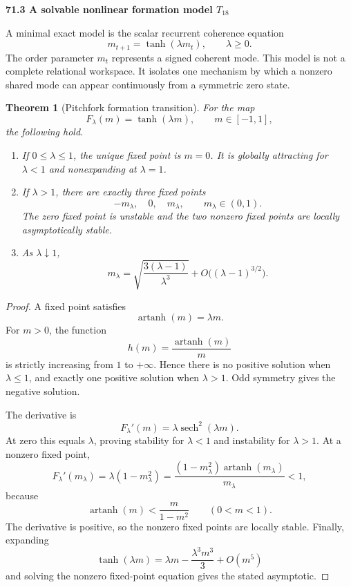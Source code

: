 \documentclass[11pt,letterpaper]{article}
\newcommand{\subtopic}[1]{%
 \vspace{0.45em}
 {\bfseries\color{AccentColor} #1\par}
}
\theoremstyle{plain}
\newtheorem{theorem}{Theorem}
\theoremstyle{definition}
\begin{document}
\subtopic{71.3 A solvable nonlinear formation model \(T_{18}\) }

A minimal exact model is the scalar recurrent coherence equation
\[
\boxed{
m_{t+1}=\tanh(\lambda m_t),
\qquad
\lambda\geq0.
}
\]
The order parameter \(m_t\) represents a signed coherent mode. This model is
not a complete relational workspace. It isolates one mechanism by which a
nonzero shared mode can appear continuously from a symmetric zero state.

\begin{theorem}[Pitchfork formation transition]\label{thm:pitchfork-formation}
For the map
\[
F_\lambda(m)=\tanh(\lambda m),
\qquad
m\in[-1,1],
\]
the following hold.
\begin{enumerate}
\item If \(0\leq\lambda\leq1\), the unique fixed point is \(m=0\).
 It is globally attracting for \(\lambda<1\) and nonexpanding at
 \(\lambda=1\).
\item If \(\lambda>1\), there are exactly three fixed points
 \[
 -m_\lambda,
 \quad0,
 \quad m_\lambda,
 \qquad
 m_\lambda\in(0,1).
 \]
 The zero fixed point is unstable and the two nonzero fixed points are
 locally asymptotically stable.
\item As \(\lambda\downarrow1\),
 \[
 \boxed{
 m_\lambda
 =
 \sqrt{\frac{3(\lambda-1)}{\lambda^3}}
 +
 O\bigl((\lambda-1)^{3/2}\bigr).
 }
 \]
\end{enumerate}
\end{theorem}

\begin{proof}
A fixed point satisfies
\[
\operatorname{artanh}(m)=\lambda m.
\]
For \(m>0\), the function
\[
h(m)=\frac{\operatorname{artanh}(m)}{m}
\]
is strictly increasing from \(1\) to \(+\infty\). Hence there is no positive
solution when \(\lambda\leq1\), and exactly one positive solution when
\(\lambda>1\). Odd symmetry gives the negative solution.

The derivative is
\[
F_\lambda'(m)
=
\lambda\operatorname{sech}^2(\lambda m).
\]
At zero this equals \(\lambda\), proving stability for \(\lambda<1\) and
instability for \(\lambda>1\). At a nonzero fixed point,
\[
F_\lambda'(m_\lambda)
=
\lambda(1-m_\lambda^2)
=
\frac{(1-m_\lambda^2)\operatorname{artanh}(m_\lambda)}{m_\lambda}
<1,
\]
because
\[
\operatorname{artanh}(m)
<
\frac{m}{1-m^2}
\qquad(0<m<1).
\]
The derivative is positive, so the nonzero fixed points are locally stable.
Finally, expanding
\[
\tanh(\lambda m)
=
\lambda m-
\frac{\lambda^3m^3}{3}
+O(m^5)
\]
and solving the nonzero fixed-point equation gives the stated asymptotic.
\end{proof}
\end{document}
